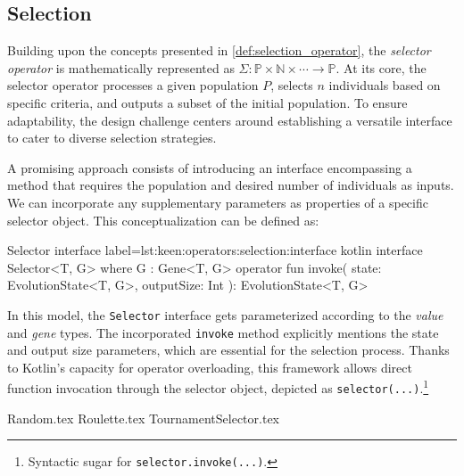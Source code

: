 \subsection{Selection}
\label{sec:keen:operators:selection}
  Building upon the concepts presented in \vref{def:selection_operator}, the 
  \emph{selector operator} is mathematically represented as \(\Sigma : \mathbb
  {P} \times \mathbb{N} \times \cdots \to \mathbb{P}\).
  At its core, the selector operator processes a given population 
  \(P\), selects \(n\) individuals based on specific criteria, and 
  outputs a subset of the initial population.
  To ensure adaptability, the design challenge centers around establishing a 
  versatile interface to cater to diverse selection strategies.

  A promising approach consists of introducing an interface encompassing a 
  method that requires the population and desired number of individuals as 
  inputs.
  We can incorporate any supplementary parameters as properties of a specific 
  selector object.
  This conceptualization can be defined as:

  \begin{code}{Selector interface}{
    label=lst:keen:operators:selection:interface
  }{kotlin}
    interface Selector<T, G> where G : Gene<T, G> {
        operator fun invoke(
            state: EvolutionState<T, G>, outputSize: Int
        ): EvolutionState<T, G>
    }
  \end{code}

  In this model, the \texttt{Selector} interface gets parameterized according 
  to the \textit{value} and \textit{gene} types.
  The incorporated \texttt{invoke} method explicitly mentions the state and 
  output size parameters, which are essential for the selection process.
  Thanks to Kotlin's capacity for operator overloading, this framework allows 
  direct function invocation through the selector object, depicted as \texttt
  {selector(...)}.\footnote{Syntactic sugar for \texttt{selector.invoke(...)}.}

  {Random.tex}
  {Roulette.tex}
  {TournamentSelector.tex}
